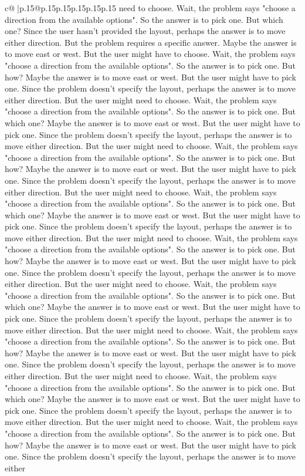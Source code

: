 \documentclass{article}
\begin{document}
{\begin{supertabular}{c@{$\;$}|p{.15\linewidth}@{}p{.15\linewidth}p{.15\linewidth}p{.15\linewidth}p{.15\linewidth}p{.15\linewidth}}
{{{need to choose. Wait, the problem says "choose a direction from the available options". So the answer is to pick one. But which one? Since the user hasn't provided the layout, perhaps the answer is to move either direction. But the problem requires a specific answer. Maybe the answer is to move east or west. But the user might have to choose. Wait, the problem says "choose a direction from the available options". So the answer is to pick one. But how? Maybe the answer is to move east or west. But the user might have to pick one. Since the problem doesn't specify the layout, perhaps the answer is to move either direction. But the user might need to choose. Wait, the problem says "choose a direction from the available options". So the answer is to pick one. But which one? Maybe the answer is to move east or west. But the user might have to pick one. Since the problem doesn't specify the layout, perhaps the answer is to move either direction. But the user might need to choose. Wait, the problem says "choose a direction from the available options". So the answer is to pick one. But how? Maybe the answer is to move east or west. But the user might have to pick one. Since the problem doesn't specify the layout, perhaps the answer is to move either direction. But the user might need to choose. Wait, the problem says "choose a direction from the available options". So the answer is to pick one. But which one? Maybe the answer is to move east or west. But the user might have to pick one. Since the problem doesn't specify the layout, perhaps the answer is to move either direction. But the user might need to choose. Wait, the problem says "choose a direction from the available options". So the answer is to pick one. But how? Maybe the answer is to move east or west. But the user might have to pick one. Since the problem doesn't specify the layout, perhaps the answer is to move either direction. But the user might need to choose. Wait, the problem says "choose a direction from the available options". So the answer is to pick one. But which one? Maybe the answer is to move east or west. But the user might have to pick one. Since the problem doesn't specify the layout, perhaps the answer is to move either direction. But the user might need to choose. Wait, the problem says "choose a direction from the available options". So the answer is to pick one. But how? Maybe the answer is to move east or west. But the user might have to pick one. Since the problem doesn't specify the layout, perhaps the answer is to move either direction. But the user might need to choose. Wait, the problem says "choose a direction from the available options". So the answer is to pick one. But which one? Maybe the answer is to move east or west. But the user might have to pick one. Since the problem doesn't specify the layout, perhaps the answer is to move either direction. But the user might need to choose. Wait, the problem says "choose a direction from the available options". So the answer is to pick one. But how? Maybe the answer is to move east or west. But the user might have to pick one. Since the problem doesn't specify the layout, perhaps the answer is to move either }}}
\end{supertabular}}
\end{document}
